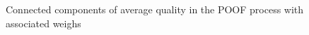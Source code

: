 \documentclass[twoside]{article}
\begin{document}
\begin{multicols}{2}
\begin{figure}[H]
\centering
{}
\quad
{}
\quad
{}
\caption{Connected components of average quality in the POOF process with associated weighs}
\label{fig:fig_std}
\end{figure}


\end{multicols}
\end{document}
